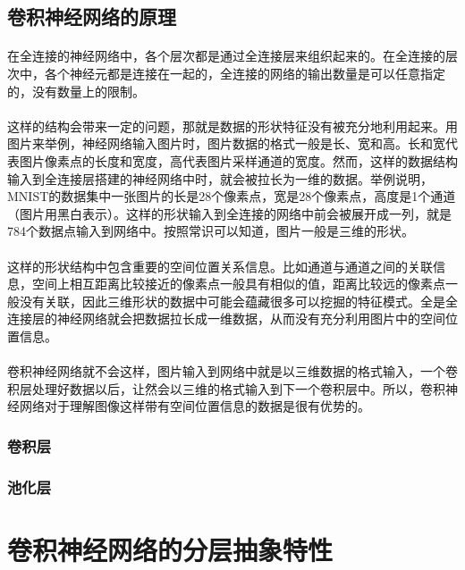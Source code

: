\subsection{卷积神经网络的原理}
\paragraph{}在全连接的神经网络中，各个层次都是通过全连接层来组织起来的。在全连接的层次中，各个神经元都是连接在一起的，全连接的网络的输出数量是可以任意指定的，没有数量上的限制。
\paragraph{}这样的结构会带来一定的问题，那就是数据的形状特征没有被充分地利用起来。用图片来举例，神经网络输入图片时，图片数据的格式一般是长、宽和高。长和宽代表图片像素点的长度和宽度，高代表图片采样通道的宽度。然而，这样的数据结构输入到全连接层搭建的神经网络中时，就会被拉长为一维的数据。举例说明，MNIST的数据集中一张图片的长是28个像素点，宽是28个像素点，高度是1个通道（图片用黑白表示）。这样的形状输入到全连接的网络中前会被展开成一列，就是784个数据点输入到网络中。按照常识可以知道，图片一般是三维的形状。
\paragraph{}这样的形状结构中包含重要的空间位置关系信息。比如通道与通道之间的关联信息，空间上相互距离比较接近的像素点一般具有相似的值，距离比较远的像素点一般没有关联，因此三维形状的数据中可能会蕴藏很多可以挖掘的特征模式。全是全连接层的神经网络就会把数据拉长成一维数据，从而没有充分利用图片中的空间位置信息。
\paragraph{}卷积神经网络就不会这样，图片输入到网络中就是以三维数据的格式输入，一个卷积层处理好数据以后，让然会以三维的格式输入到下一个卷积层中。所以，卷积神经网络对于理解图像这样带有空间位置信息的数据是很有优势的。
\subsubsection{卷积层}

\subsubsection{池化层}

\section{卷积神经网络的分层抽象特性}
